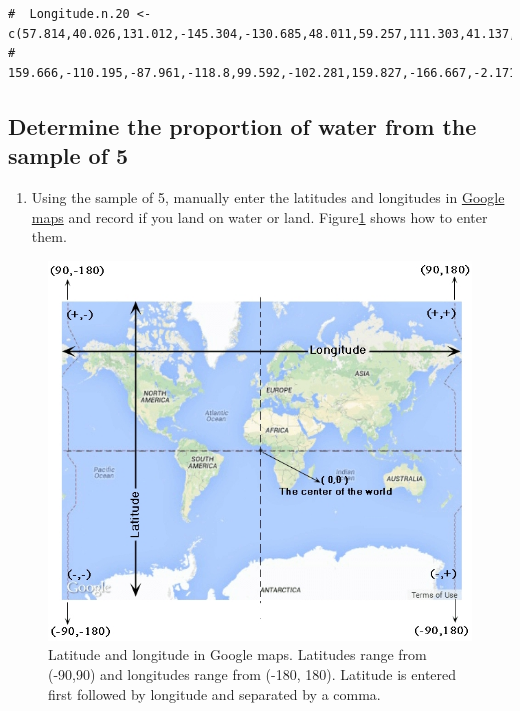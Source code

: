 \documentclass[letterpaper,12pt,twoside,]{pinp}
\providecommand{\tightlist}{%
  \setlength{\itemsep}{0pt}\setlength{\parskip}{0pt}}
\begin{document}
\begin{ShadedResult}
\begin{verbatim}
#  Longitude.n.20 <- c(57.814,40.026,131.012,-145.304,-130.685,48.011,59.257,111.303,41.137,-61.05,
#  159.666,-110.195,-87.961,-118.8,99.592,-102.281,159.827,-166.667,-2.171,-6.664)
\end{verbatim}
\end{ShadedResult}

\hypertarget{determine-the-proportion-of-water-from-the-sample-of-5}{%
\subsection{Determine the proportion of water from the sample of
5}\label{determine-the-proportion-of-water-from-the-sample-of-5}}

\begin{enumerate}
\def\labelenumi{\arabic{enumi}.}
\tightlist
\item
  Using the sample of 5, manually enter the latitudes and longitudes in
  \href{https://www.google.com/maps}{Google maps} and record if you land
  on water or land. Figure\ref{maps} shows how to enter them.
\end{enumerate}

\begin{figure}[H]
  \begin{center}
    \includegraphics[scale=0.40]{lat-long.png} 
  \end{center}
  \caption{Latitude and longitude in Google maps. Latitudes range from (-90,90) and longitudes range from (-180, 180). Latitude is entered first followed by longitude and separated by a comma.}\label{maps}
\end{figure}
\end{document}
